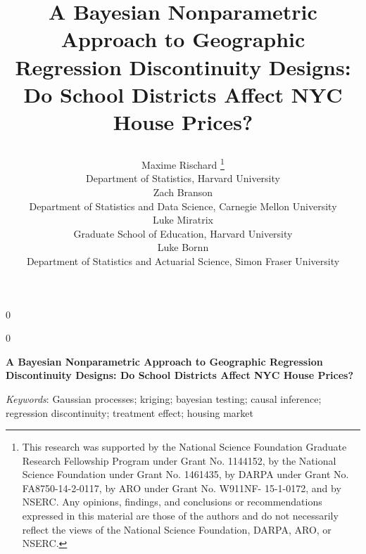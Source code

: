 \documentclass[12pt]{article}
\newcommand{\georddtitle}{
    A Bayesian Nonparametric Approach to Geographic Regression Discontinuity Designs:
    Do School Districts Affect NYC House Prices?
}
\newcommand{\georddkeywords}{Gaussian processes; kriging; bayesian testing; causal inference; regression discontinuity; treatment effect; housing market}
\newcommand{\blind}{0}
\newcommand{\georddauthor}{
    Maxime Rischard
    \thanks{
This research was supported by the National Science Foundation Graduate Research Fellowship Program under Grant No. 1144152, by the National Science Foundation under Grant No. 1461435, by DARPA under Grant No. FA8750-14-2-0117, by ARO under Grant No. W911NF- 15-1-0172, and by NSERC. Any opinions, findings, and conclusions or recommendations expressed in this material are those of the authors and do not necessarily reflect the views of the National Science Foundation, DARPA, ARO, or NSERC.}
    \vspace{-0.5em}
    \\
    Department of Statistics, Harvard University \\

    Zach Branson \vspace{-0.5em} \\
    Department of Statistics and Data Science, Carnegie Mellon University \\

    Luke Miratrix \vspace{-0.5em} \\
    Graduate School of Education, Harvard University \\

    Luke Bornn \vspace{-0.5em} \\
    Department of Statistics and Actuarial Science, Simon Fraser University 
}
\begin{document}
\doublespacing



\blind
{
\title{
    \Large
    \bf
    \georddtitle
}
\author{\georddauthor}
\maketitle
} \fi

\blind
{
  \bigskip
  \bigskip
  \bigskip
  \begin{center}
    {\LARGE\bf \georddtitle}
\end{center}
  \medskip
} \fi
\begin{abstract}
    
\end{abstract}

\noindent%
{\it Keywords}: \georddkeywords
\vfill
\newpage






\begin{appendices}
    
\end{appendices}
\end{document}
